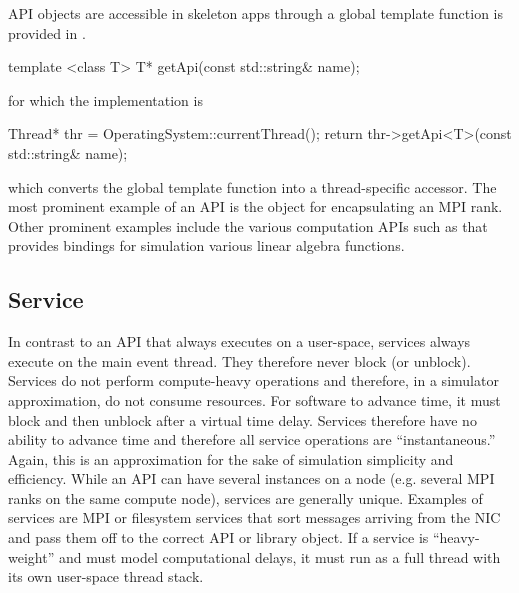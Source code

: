 API objects are accessible in skeleton apps through a global template function is provided in .

\begin{CppCode}
template <class T>
T* getApi(const std::string& name);
\end{CppCode}
for which the implementation is

\begin{CppCode}
Thread* thr = OperatingSystem::currentThread();
return thr->getApi<T>(const std::string& name);
\end{CppCode}
which converts the global template function into a thread-specific accessor.
The most prominent example of an API is the  object for encapsulating an MPI rank.
Other prominent examples include the various computation APIs such as  that provides bindings for simulation various linear algebra functions.


\subsection{Service}
\label{subsec:service}
In contrast to an API that always executes on a user-space, services always execute on the main event thread.
They therefore never block (or unblock).
Services do not perform compute-heavy operations and therefore, in a simulator approximation, do not consume resources. 
For software to advance time, it must block and then unblock after a virtual time delay.
Services therefore have no ability to advance time and therefore all service operations are ``instantaneous.''
Again, this is an approximation for the sake of simulation simplicity and efficiency.
While an API can have several instances on a node (e.g. several MPI ranks on the same compute node), services are generally unique.
Examples of services are MPI or filesystem services that sort messages arriving from the NIC and pass them off to the correct API or library object.
If a service is ``heavy-weight'' and must model computational delays,
it must run as a full thread with its own user-space thread stack.

